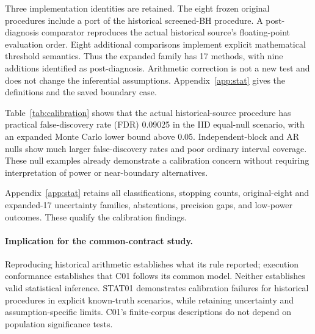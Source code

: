 Three implementation identities are retained. The eight frozen original
procedures include a port of the historical screened-BH procedure. A
post-diagnosis comparator reproduces the actual historical source's
floating-point evaluation order. Eight additional comparisons implement
explicit mathematical threshold semantics. Thus the expanded family has
17 methods, with nine additions identified as post-diagnosis. Arithmetic
correction is not a new test and does not change the inferential assumptions.
Appendix~\ref{app:stat} gives the definitions and the saved boundary case.

\begin{table}[t]
\centering\small\setlength{\tabcolsep}{3pt}
\caption{Compact calibration diagnostic for the actual historical-source
screened-BH comparator. Each row has 8,000 studies; ordinary fixed-contrast
interval coverage is available in all of them. Bounds are the expanded
17-method simultaneous Monte Carlo bounds, not confidence intervals for
C01 performance. These three null scenarios isolate IID, independent-block,
and autoregressive (AR) dependence; all 18 scenarios and methods remain in the supplement.}
\label{tab:calibration}
\end{table}

Table~\ref{tab:calibration} shows that the actual historical-source procedure
has practical false-discovery rate (FDR) 0.09025 in the IID equal-null scenario, with an expanded
Monte Carlo lower bound above 0.05. Independent-block and AR nulls show
much larger false-discovery rates and poor ordinary interval coverage.
These null examples already demonstrate a calibration concern without
requiring interpretation of power or near-boundary alternatives.

Appendix~\ref{app:stat} retains all classifications, stopping counts,
original-eight and expanded-17 uncertainty families, abstentions, precision
gaps, and low-power outcomes. These qualify the calibration findings.

\paragraph{Implication for the common-contract study.}
Reproducing historical arithmetic establishes what its rule reported;
execution conformance establishes that C01 follows its common model.
Neither establishes valid statistical inference. STAT01 demonstrates
calibration failures for historical procedures in explicit known-truth
scenarios, while retaining uncertainty and assumption-specific limits.
C01's finite-corpus descriptions do not depend on population significance tests.
